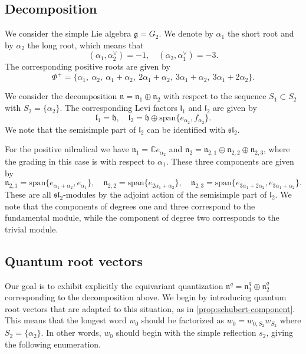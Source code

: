 \documentclass[a4paper, 12pt, reqno, english]{amsart}
\numberwithin{equation}{section}
\numberwithin{figure}{section}
\theoremstyle{plain}
\theoremstyle{plain}
\theoremstyle{plain}
\theoremstyle{plain}
\theoremstyle{plain}
\theoremstyle{definition}
\theoremstyle{definition}
\theoremstyle{definition}
\theoremstyle{remark}
\theoremstyle{definition}
\theoremstyle{definition}
\newcommand{\bbC}{\mathbb{C}}
\newcommand{\lieg}{\mathfrak{g}}
\newcommand{\lieh}{\mathfrak{h}}
\newcommand{\liel}{\mathfrak{l}}
\newcommand{\lien}{\mathfrak{n}}
\newcommand{\roots}{\Phi}
\newcommand{\lspan}{\mathrm{span}}
\newcommand{\qnil}{\lien^q}
\begin{document}
\subsection{Decomposition}

We consider the simple Lie algebra $\lieg = G_2$.
We denote by $\alpha_1$ the short root and by $\alpha_2$ the long root, which means that
\[
(\alpha_1, \alpha_2^\vee) = -1, \quad
(\alpha_2, \alpha_1^\vee) = -3.
\]
The corresponding positive roots are given by
\[
\roots^+ = \{ \alpha_1, \ \alpha_2, \ \alpha_1 + \alpha_2, \ 2 \alpha_1 + \alpha_2, \ 3 \alpha_1 + \alpha_2, \ 3 \alpha_1 + 2 \alpha_2 \}.
\]

We consider the decomposition $\lien = \lien_1 \oplus \lien_2$ with respect to the sequence $S_1 \subset S_2$ with $S_2 = \{ \alpha_2 \}$.
The corresponding Levi factors $\liel_1$ and $\liel_2$ are given by
\[
\liel_1 = \lieh, \quad
\liel_2 = \lieh \oplus \lspan \{ e_{\alpha_2}, f_{\alpha_2} \}.
\]
We note that the semisimple part of $\liel_2$ can be identified with $\mathfrak{sl}_2$.

For the positive nilradical we have $\lien_1 = \bbC e_{\alpha_2}$ and $\lien_2 = \lien_{2, 1} \oplus \lien_{2, 2} \oplus \lien_{2, 3}$, where the grading in this case is with respect to $\alpha_1$. These three components are given by
\[
\lien_{2, 1} = \lspan \{ e_{\alpha_1 + \alpha_2}, e_{\alpha_1} \}, \quad
\lien_{2, 2} = \lspan \{ e_{2 \alpha_1 + \alpha_2} \}, \quad
\lien_{2, 3} = \lspan \{ e_{3 \alpha_1 + 2 \alpha_2}, e_{3 \alpha_1 + \alpha_2} \}.
\]
These are all $\mathfrak{sl}_2$-modules by the adjoint action of the semisimple part of $\liel_2$. We note that the components of degrees one and three correspond to the fundamental module, while the component of degree two corresponds to the trivial module.

\subsection{Quantum root vectors}

Our goal is to exhibit explicitly the equivariant quantization $\qnil = \qnil_1 \oplus \qnil_2$ corresponding to the decomposition above.
We begin by introducing quantum root vectors that are adapted to this situation, as in \cref{prop:schubert-component}.
This means that the longest word $w_0$ should be factorized as $w_0 = w_{0, S_2} w_{S_2}$ where $S_2 = \{ \alpha_2 \}$.
In other words, $w_0$ should begin with the simple reflection $s_2$, giving  the following enumeration.
\end{document}
